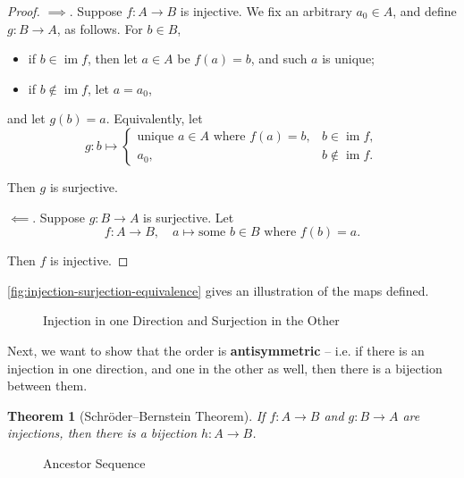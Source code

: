 \documentclass{article}
\newtheorem{theorem}{Theorem}[section]
\theoremstyle{definition}
\theoremstyle{remark}
\newcommand{\pqty}[1]{\left(#1\right)}
\newcommand{\functiondomain}[3]{#1:#2\to #3}
\newcommand{\functionmap}[3]{#1:#2\mapsto #3}
\newcommand{\function}[5]{#1:#2\to #3,\quad #4\mapsto #5}
\newcommand{\img}{\operatorname{im}}
\begin{document}
\begin{proof}
    \(\implies\). Suppose \(\functiondomain{f}{A}{B}\) is injective. We fix an arbitrary \(a_0 \in A\), and define \(\functiondomain{g}{B}{A}\), as follows. For \(b \in B\),
    \begin{itemize}
        \item if \(b \in \img f\), then let \(a \in A\) be \(f \pqty{a} = b\), and such \(a\) is unique; 
        \item if \(b \notin \img f\), let \(a = a_0\),
    \end{itemize}
    and let \(g\pqty{b} = a\). Equivalently, let
    \[
        \functionmap{g}{b}{\begin{cases}
            \text{unique } a \in A \text{ where } f\pqty{a} = b, & b \in \img f, \\
            a_0, & b \notin \img f.
        \end{cases}}
    \]

    Then \(g\) is surjective.

    \(\impliedby\). Suppose \(\functiondomain{g}{B}{A}\) is surjective. Let
    \[
        \function{f}{A}{B}{a}{\text{some } b \in B \text{ where } f \pqty{b} = a.}
    \]

    Then \(f\) is injective.
\end{proof}

\autoref{fig:injection-surjection-equivalence} gives an illustration of the maps defined.

\begin{figure}[ht!]
    \centering
    \caption{Injection in one Direction and Surjection in the Other}
    \label{fig:injection-surjection-equivalence}
\end{figure}

Next, we want to show that the order is \textbf{antisymmetric} -- i.e. if there is an injection in one direction, and one in the other as well, then there is a bijection between them.

\begin{theorem}[Schr\"{o}der--Bernstein Theorem]
    If \(\functiondomain{f}{A}{B}\) and \(\functiondomain{g}{B}{A}\) are injections, then there is a bijection \(\functiondomain{h}{A}{B}\).
\end{theorem}

\begin{figure}[ht!]
    \centering
    \caption{Ancestor Sequence}
    \label{fig:ancestor-sequence}
\end{figure}
\end{document}
